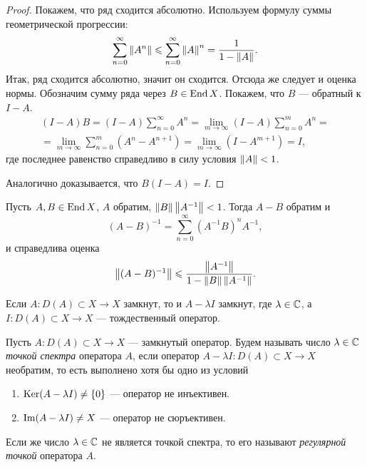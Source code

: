 \begin{proof}
    Покажем, что ряд сходится абсолютно. Используем формулу суммы геометрической прогрессии:
    \[ \sum_{n=0}^\infty \left\|A^n\right\| \leqslant \sum_{n=0}^\infty \left\|A\right\|^n = \frac{1}{1-\left\|A\right\|}. \]
    Итак, ряд сходится абсолютно, значит он сходится. Отсюда же следует и оценка нормы.
    Обозначим сумму ряда через $B \in \operatorname{End} X$. Покажем, что $B$ --- обратный к $I - A$.
    \begin{multline*}
        (I - A)B = (I - A)\sum_{n=0}^\infty A^n = \lim_{m\to \infty} (I - A)\sum_{n=0}^m A^n = \\
            = \lim_{m \to \infty} \sum_{n=0}^m (A^n - A^{n+1}) = \lim_{m\to \infty} (I - A^{m+1})
            = I,
    \end{multline*}
    где последнее равенство справедливо в силу условия $\left\|A\right\| < 1$.

    Аналогично доказывается, что $B(I - A) = I$.
\end{proof}

\begin{theorem}
    Пусть $A, B \in \operatorname{End} X$, $A$ обратим, $\left\|B\right\|\left\|A^{-1}\right\| < 1$. Тогда $A - B$ обратим и
    \[ (A-B)^{-1} = \sum_{n=0}^\infty (A^{-1}B)^n A^{-1}, \]
    и справедлива оценка
    \[ \left\|(A-B)^{-1}\right\| \leqslant \frac{\left\|A^{-1}\right\|}{1-\left\|B\right\|\left\|A^{-1}\right\|}. \]
\end{theorem}

\begin{lemma}
    Если $A \colon D(A) \subset X \to X$ замкнут, то и $A - \lambda I$ замкнут, 
    где $\lambda \in \mathbb{C}$, а $I \colon D(A) \subset X \to X$ --- тождественный оператор.
\end{lemma}

\begin{definition}
    Пусть $A \colon D(A) \subset X \to X$ --- замкнутый оператор. 
    Будем называть число $\lambda \in \mathbb{C}$ \emph{точкой спектра} оператора $A$, если оператор 
    $ A - \lambda I \colon D(A) \subset X \to X $ необратим, то есть выполнено хотя бы одно из 
    условий
    \begin{enumerate}
        \item $\operatorname{Ker} (A - \lambda I) \neq \left\{0\right\}$ --- оператор не инъективен.
        \item $\operatorname{Im} (A - \lambda I) \neq X$ --- оператор не сюръективен.
    \end{enumerate}

    Если же число $\lambda \in \mathbb{C}$ не является точкой спектра, то его называют
    \emph{регулярной точкой} оператора $A$.
\end{definition}

